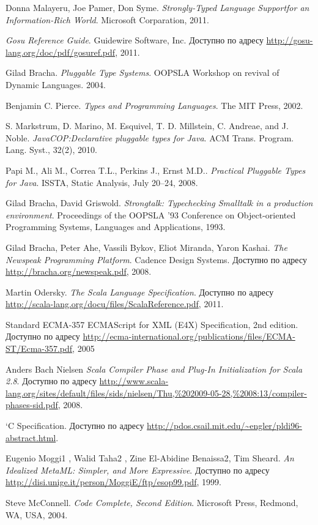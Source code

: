 \begin{thebibliography}{9}

    Donna Malayeru, Joe Pamer, Don Syme.
    \emph{Strongly-Typed Language Supportfor an Information-Rich World}.
    Microsoft Corparation,
    2011.

    \emph{Gosu Reference Guide}.
    Guidewire Software, Inc.
    Доступно по адресу \url{http://gosu-lang.org/doc/pdf/gosuref.pdf},
    2011.

    Gilad Bracha.
    \emph{Pluggable Type Systems}.
    OOPSLA Workshop on revival of Dynamic Languages.
    2004.

    Benjamin C. Pierce.
    \emph{Types and Programming Languages}.
    The MIT Press, 2002.

    S. Markstrum, D. Marino, M. Esquivel, T. D. Millstein, C. Andreae, and J. Noble.
    \emph{JavaCOP:\@ Declarative pluggable types for Java}.
    ACM Trans. Program. Lang. Syst., 32(2), 2010.

    Papi M., Ali M., Correa T.L., Perkins J., Ernst M.D..
    \emph{Practical Pluggable Types for Java}.
    ISSTA, Static Analysis, July 20–24, 2008.

    Gilad Bracha, David Griswold.
    \emph{Strongtalk: Typechecking Smalltalk in a production environment}.
    Proceedings of the OOPSLA '93 Conference on Object-oriented Programming Systems, Languages and Applications, 1993.

    Gilad Bracha, Peter Ahe, Vassili Bykov, Eliot Miranda, Yaron Kashai.
    \emph{The Newspeak Programming Platform}.
    Cadence Design Systems.
    Доступно по адресу \url{http://bracha.org/newspeak.pdf},
    2008.

    Martin Odersky.
    \emph{The Scala Language Specification}.
    Доступно по адресу \url{http://scala-lang.org/docu/files/ScalaReference.pdf},
    2011.

    Standard ECMA-357
    ECMAScript for XML (E4X) Specification,
    2nd edition.
    Доступно по адресу \url{http://ecma-international.org/publications/files/ECMA-ST/Ecma-357.pdf},
    2005

    Anders Bach Nielsen
    \emph{Scala Compiler Phase and Plug-In Initialization for Scala 2.8}.
    Доступно по адресу \url{http://www.scala-lang.org/sites/default/files/sids/nielsen/Thu,%202009-05-28,%2008:13/compiler-phases-sid.pdf},
    2008.

    `C Specification.
    Доступно по адресу \url{http://pdos.csail.mit.edu/~engler/pldi96-abstract.html}.

    Eugenio Moggi1 , Walid Taha2 , Zine El-Abidine Benaissa2, Tim Sheard.
    \emph{An Idealized MetaML: Simpler, and More Expressive}.
    Доступно по адресу \url{http://disi.unige.it/person/MoggiE/ftp/esop99.pdf},
    1999.

    Steve McConnell. \emph{Code Complete, Second Edition}. Microsoft Press, Redmond, WA, USA, 2004.

\end{thebibliography}